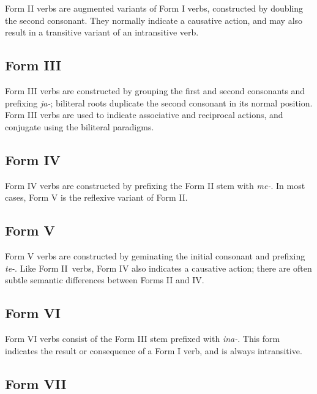 \documentclass[grammar]{subfiles}
\begin{document}
	Form II verbs are augmented variants of Form I verbs, constructed by doubling the second consonant. They normally indicate a causative action, and may also result in a transitive variant of an intransitive verb.

	\subsection{Form III}
	\label{sec:dev_verb_form_iii}

	Form III verbs are constructed by grouping the first and second consonants and prefixing \emph{ja-}; biliteral roots duplicate the second consonant in its normal position. Form III verbs are used to indicate associative and reciprocal actions, and conjugate using the biliteral paradigms.
	

	\subsection{Form IV}
	\label{sec:dev_verb_form_iv}

	Form IV verbs are constructed by prefixing the Form II stem with \emph{me-}. In most cases, Form V is the reflexive variant of Form II.

	\subsection{Form V}
	\label{sec:dev_verb_form_v}

	Form V verbs are constructed by geminating the initial consonant and prefixing \emph{te-}. Like Form II verbs, Form IV also indicates a causative action; there are often subtle semantic differences between Forms II and IV.

	\subsection{Form VI}
	\label{sec:dev_verb_form_vi}

	Form VI verbs consist of the Form III stem prefixed with \emph{ina-}. This form indicates the result or consequence of a Form I verb, and is always intransitive.

	\subsection{Form VII}
	\label{sec:dev_verb_form_vii}
\end{document}
